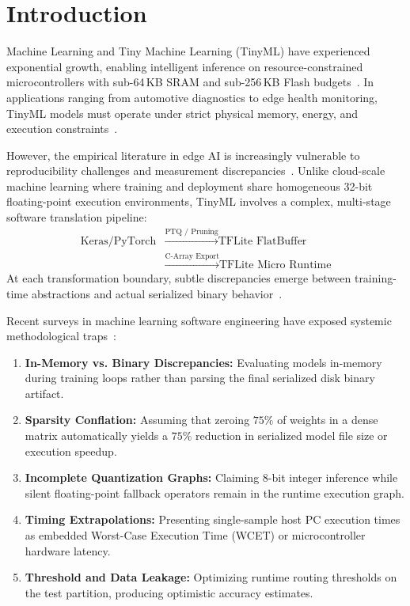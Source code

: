 \documentclass[journal]{IEEEtran}
\begin{document}
\maketitle
\IEEEdisplaynontitleabstractindextext

\section{Introduction}
 Machine Learning and Tiny Machine Learning (TinyML) have experienced exponential growth, enabling intelligent inference on resource-constrained microcontrollers with sub-64\,KB SRAM and sub-256\,KB Flash budgets~\cite{warden2019tinyml,ray2022review,sanchez2020tinyml}. In applications ranging from automotive diagnostics to edge health monitoring, TinyML models must operate under strict physical memory, energy, and execution constraints~\cite{banbury2021benchmarking,saha2022tinyml,sze2017efficient,liberis2021munas}.

However, the empirical literature in edge AI is increasingly vulnerable to reproducibility challenges and measurement discrepancies~\cite{pineau2021improving,kapoor2023leakage,henderson2018deep}. Unlike cloud-scale machine learning where training and deployment share homogeneous 32-bit floating-point execution environments, TinyML involves a complex, multi-stage software translation pipeline:
\begin{align*}
    \text{Keras/PyTorch} &\xrightarrow{\text{PTQ / Pruning}} \text{TFLite FlatBuffer} \\
    &\xrightarrow{\text{C-Array Export}} \text{TFLite Micro Runtime}
\end{align*}
At each transformation boundary, subtle discrepancies emerge between training-time abstractions and actual serialized binary behavior~\cite{david2021tensorflow,blalock2020state,lin2020mcunet}.

Recent surveys in machine learning software engineering have exposed systemic methodological traps~\cite{sculley2015hidden,amershi2019software}:
\begin{enumerate}
    \item \textbf{In-Memory vs. Binary Discrepancies:} Evaluating models in-memory during training loops rather than parsing the final serialized disk binary artifact.
    \item \textbf{Sparsity Conflation:} Assuming that zeroing $75\%$ of weights in a dense matrix automatically yields a $75\%$ reduction in serialized model file size or execution speedup.
    \item \textbf{Incomplete Quantization Graphs:} Claiming 8-bit integer inference while silent floating-point fallback operators remain in the runtime execution graph.
    \item \textbf{Timing Extrapolations:} Presenting single-sample host PC execution times as embedded Worst-Case Execution Time (WCET) or microcontroller hardware latency.
    \item \textbf{Threshold and Data Leakage:} Optimizing runtime routing thresholds on the test partition, producing optimistic accuracy estimates.
\end{enumerate}
\end{document}
